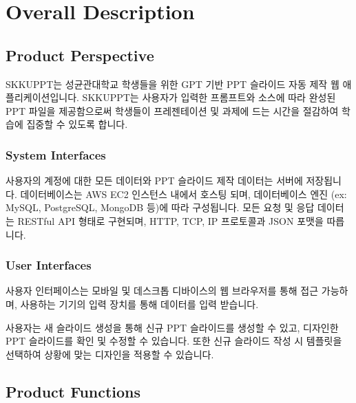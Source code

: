 \documentclass[a4paper, 12pt]{article}
\begin{document}
\begin{spacing}{1.25} %
\renewcommand\bibname{References} %


\end{spacing}

\section{Overall Description}
\subsection{Product Perspective}
SKKUPPT는 성균관대학교 학생들을 위한 GPT 기반 PPT 슬라이드 자동 제작 웹 애플리케이션입니다. SKKUPPT는 사용자가 입력한 프롬프트와 소스에 따라 완성된 PPT 파일을 제공함으로써 학생들이 프레젠테이션 및 과제에 드는 시간을 절감하여 학습에 집중할 수 있도록 합니다.
\subsubsection{System Interfaces}
사용자의 계정에 대한 모든 데이터와 PPT 슬라이드 제작 데이터는 서버에 저장됩니다. 데이터베이스는 AWS EC2 인스턴스 내에서 호스팅 되며, 데이터베이스 엔진 (ex: MySQL, PostgreSQL, MongoDB 등)에 따라 구성됩니다. 모든 요청 및 응답 데이터는 RESTful API 형태로 구현되며, HTTP, TCP, IP 프로토콜과 JSON 포맷을 따릅니다.
\subsubsection{User Interfaces}
사용자 인터페이스는 모바일 및 데스크톱 디바이스의 웹 브라우저를 통해 접근 가능하며, 사용하는 기기의 입력 장치를 통해 데이터를 입력 받습니다. 

사용자는 새 슬라이드 생성을 통해 신규 PPT 슬라이드를 생성할 수 있고, 디자인한 PPT 슬라이드를 확인 및 수정할 수 있습니다. 또한 신규 슬라이드 작성 시 템플릿을 선택하여 상황에 맞는 디자인을 적용할 수 있습니다.

\subsection{Product Functions}
\end{document}
